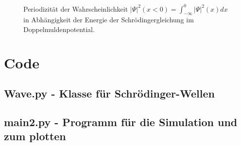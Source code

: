 \documentclass[a4paper, 11pt]{scrartcl}
\begin{document}
\begin{figure}[H]
\caption{Periodizität der Wahrscheinlichkeit $\vert \Psi \vert^2 (x < 0) = \int_{-\infty}^{0} \vert \Psi \vert^2(x) dx$ in Abhängigkeit der Energie der Schrödingergleichung im Doppelmuldenpotential.}
\label{fig:period}
\end{figure}

\newpage
\section{Code}
\subsection{Wave.py - Klasse für Schrödinger-Wellen}

\newpage
\subsection{main2.py - Programm für die Simulation und zum plotten}

\end{document}
